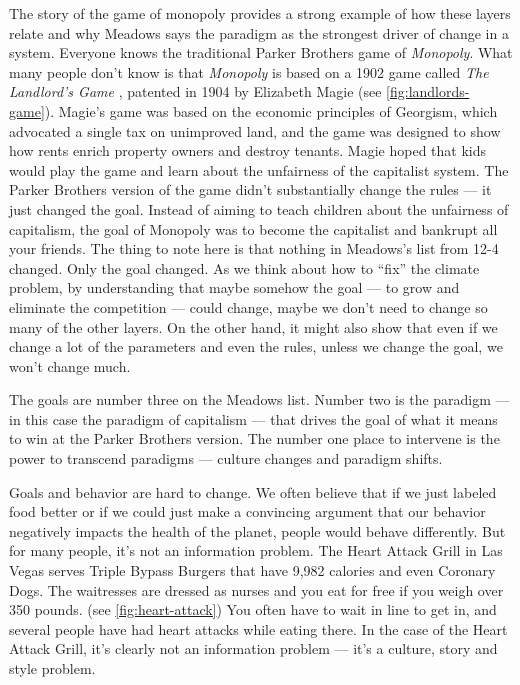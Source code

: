 The story of the game of monopoly provides a strong example of how these layers relate and why Meadows says the paradigm as the strongest driver of change in a system. Everyone knows the traditional Parker Brothers game of \emph{Monopoly}. What many people don't know is that \emph{Monopoly} \cite{monopoly} is based on a 1902 game called \emph{The Landlord's Game} \cite{landlords-game}, patented in 1904 by Elizabeth Magie (see \autoref{fig:landlords-game}). Magie's game was based on the economic principles of Georgism, which advocated a single tax on unimproved land, and the game was designed to show how rents enrich property owners and destroy tenants. Magie hoped that kids would play the game and learn about the unfairness of the capitalist system. The Parker Brothers version of the game didn't substantially change the rules --- it just changed the goal. Instead of aiming to teach children about the unfairness of capitalism, the goal of Monopoly was to become the capitalist and bankrupt all your friends. The thing to note here is that nothing in Meadows's list from 12-4 changed. Only the goal changed. As we think about how to ``fix'' the climate problem, by understanding that maybe somehow the goal --- to grow and eliminate the competition --- could change, maybe we don't need to change so many of the other layers. On the other hand, it might also show that even if we change a lot of the parameters and even the rules, unless we change the goal, we won't change much.

The goals are number three on the Meadows list. Number two is the paradigm --- in this case the paradigm of capitalism --- that drives the goal of what it means to win at the Parker Brothers version. The number one place to intervene is the power to transcend paradigms --- culture changes and paradigm shifts.

Goals and behavior are hard to change. We often believe that if we just labeled food better or if we could just make a convincing argument that our behavior negatively impacts the health of the planet, people would behave differently. But for many people, it's not an information problem. The Heart Attack Grill \cite{heart-attack} in Las Vegas serves Triple Bypass Burgers that have 9,982 calories and even Coronary Dogs. The waitresses are dressed as nurses and you eat for free if you weigh over 350 pounds. (see \cref{fig:heart-attack}) You often have to wait in line to get in, and several people have had heart attacks while eating there. In the case of the Heart Attack Grill, it's clearly not an information problem --- it's a culture, story and style problem.

